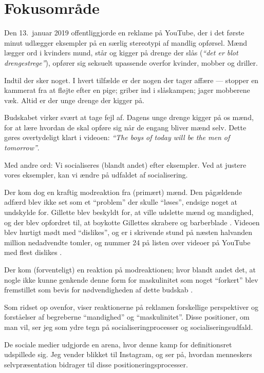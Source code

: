 \section{Fokusområde}

Den 13.\ januar 2019 offentliggjorde  
\citeauthor{gilletteWeBelieveBest2019} en reklame på YouTube, der
i det første minut udlægger eksempler på en særlig stereotypi af
mandlig opførsel. Mænd lægger ord i kvinders mund, står og kigger
på drenge der slås (\textit{“det er blot drengestrege”}), opfører 
sig seksuelt upassende overfor kvinder, mobber og driller.

Indtil der sker noget. I hvert tilfælde er der nogen der tager
affære — stopper en kammerat fra at fløjte efter en pige; griber
ind i slåskampen; jager mobberene væk. Altid er der unge drenge
der kigger på.

Budskabet virker svært at tage fejl af. Dagens unge drenge kigger
på os mænd, for at lære hvordan de skal opføre sig når de engang
bliver mænd selv. Dette gøres overtydeligt klart i videoen: 
\textit{“The boys of today will be the men of tomorrow”}.

Med andre ord: Vi socialiseres (blandt andet) efter eksempler. Ved
at justere vores eksempler, kan vi ændre på udfaldet af
socialisering.

Der kom dog en kraftig modreaktion fra (primært) mænd.
Den pågældende adfærd blev ikke set som et “problem” der skulle
“løses”, endsige noget at undskylde for. Gillette blev
beskyldt for, at ville udslette mænd og mandighed, og der blev
opfordret til, at boykotte Gillettes skrabere og barberblade 
\autocite{nashGilletteFacesWidespread2019}. Videoen blev hurtigt 
mødt med “dislikes”, og er i skrivende stund på næsten halvanden 
million nedadvendte tomler, og nummer 24 på listen over videoer på 
YouTube med flest dislikes 
\autocite{wikipediaListMostdislikedYouTube2019}.

Der kom (forventeligt) en reaktion på modreaktionen; hvor blandt 
andet det, at nogle ikke kunne genkende denne form for 
maskulinitet som noget “forkert” blev fremstillet som bevis for
nødvendigheden af dette budskab 
\autocite{mutherBacklashGilletteAd2019}. 

Som ridset op ovenfor, viser reaktionerne på reklamen forskellige
perspektiver og forståelser af begreberne “mandighed” og
“maskulinitet”. Disse positioner, om man vil, ser jeg som ydre
tegn på socialiseringprocesser og socialiseringsudfald. 

De sociale medier udgjorde en arena, hvor denne kamp for 
definitionsret udspillede sig. Jeg vender blikket til Instagram, 
og ser på, hvordan menneskers selvpræsentation bidrager til disse 
positioneringsprocesser.

